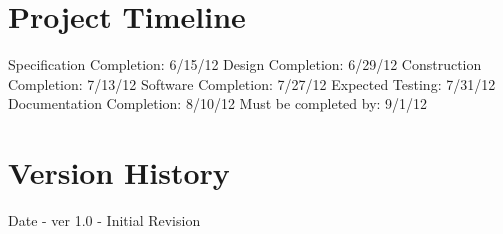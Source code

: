 \documentclass[12pt]{article}
\begin{document}
\section{Project Timeline}
Specification Completion: 6/15/12
Design Completion: 6/29/12
Construction Completion: 7/13/12
Software Completion: 7/27/12
Expected Testing: 7/31/12
Documentation Completion: 8/10/12
Must be completed by: 9/1/12

\section{Version History}
Date - ver 1.0 - Initial Revision
\end{document}
